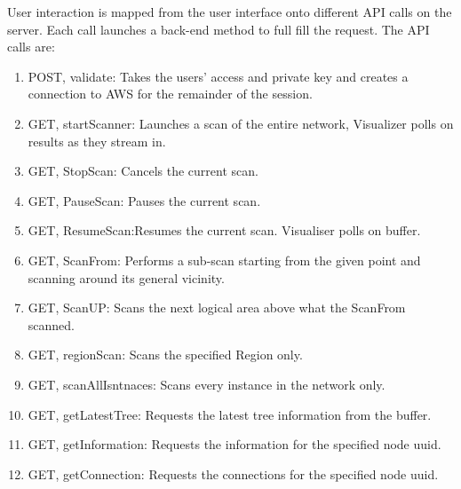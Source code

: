 \documentclass[hidelinks,a4paper,12pt]{article}
\begin{document}
User interaction is mapped from the user interface onto different API calls on the server. Each call launches a back-end method to full fill the request. The API calls are:
\begin{enumerate} 
\item POST, validate: Takes the users' access and private key and creates a connection to AWS for the remainder of the session.
\item GET, startScanner: Launches a scan of the entire network, Visualizer polls on results as they stream in. 
\item GET, StopScan: Cancels the current scan.
\item GET, PauseScan: Pauses the current scan.
\item GET, ResumeScan:Resumes the current scan. Visualiser polls on buffer.
\item GET, ScanFrom: Performs a sub-scan starting from the given point and scanning around its general vicinity.
\item GET, ScanUP: Scans the next logical area above what the ScanFrom scanned.
\item GET, regionScan: Scans the specified Region only.
\item GET, scanAllIsntnaces: Scans every instance in the network only.
\item GET, getLatestTree: Requests the latest tree information from the buffer.
\item GET, getInformation: Requests the information for the specified node uuid.
\item GET, getConnection: Requests the connections for the specified node uuid.
\end{enumerate}
\end{document}
